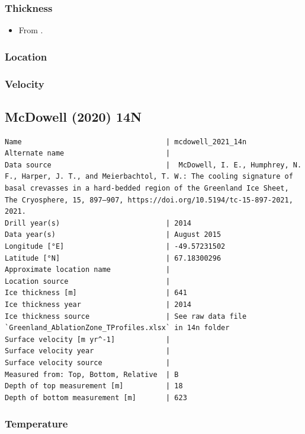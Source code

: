 \documentclass[article,a4paper,times,11pt,twoside]{article}
\begin{document}
\subsubsection{Thickness}
\label{sec:org6bdf9a7}

\begin{itemize}
\item From \textcite{luthi_2002}.
\end{itemize}

\subsubsection{Location}
\label{sec:orgdc9496b}

\subsubsection{Velocity}
\label{sec:org4f2b827}
\clearpage
\subsection{McDowell (2020) 14N}
\label{sec:org199166a}
\begin{verbatim}
Name                                  | mcdowell_2021_14n
Alternate name                        | 
Data source                           |  McDowell, I. E., Humphrey, N. F., Harper, J. T., and Meierbachtol, T. W.: The cooling signature of basal crevasses in a hard-bedded region of the Greenland Ice Sheet, The Cryosphere, 15, 897–907, https://doi.org/10.5194/tc-15-897-2021, 2021.
Drill year(s)                         | 2014
Data year(s)                          | August 2015
Longitude [°E]                        | -49.57231502
Latitude [°N]                         | 67.18300296
Approximate location name             | 
Location source                       | 
Ice thickness [m]                     | 641
Ice thickness year                    | 2014
Ice thickness source                  | See raw data file `Greenland_AblationZone_TProfiles.xlsx` in 14n folder
Surface velocity [m yr^-1]            | 
Surface velocity year                 | 
Surface velocity source               | 
Measured from: Top, Bottom, Relative  | B
Depth of top measurement [m]          | 18
Depth of bottom measurement [m]       | 623
\end{verbatim}

\subsubsection{Temperature}
\label{sec:org2423ce7}
\end{document}
